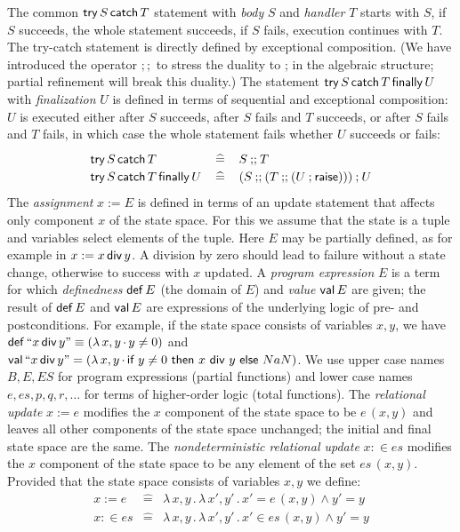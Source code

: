 \documentclass[submission,copyright,creativecommons]{eptcs}
\newcommand{\KW}[1]{\mathop{\sf #1}}
\newcommand{\RAISE}{\KW{raise}}
\newcommand{\semi}{\mathbin{;}}
\newcommand{\SEMI}{\mathbin{;\!;}}
\newcommand{\TRY}{\KW{try}}
\newcommand{\CATCH}{\KW{catch}}
\newcommand{\FINALLY}{\KW{finally}}
\newcommand{\DEF}{\KW{def}}
\newcommand{\VAL}{\KW{val}}
\newcommand{\con}{\wedge}
\renewcommand{\dot}{\mathop{.}}
\newcommand{\defeq}{\left.\widehat{=}\right.}
\newcommand{\DIV}{\KW{div}}
\begin{document}
The common $\TRY S \CATCH T$ statement with {\em body} $S$ and {\em handler} $T$ starts with $S$, if $S$ succeeds, the whole statement succeeds, if $S$ fails, execution continues with $T$. The try-catch statement is directly defined by exceptional composition. (We have introduced the operator $\SEMI$ to stress the duality to $\semi$ in the algebraic structure; partial refinement will break this duality.) The statement $\TRY S\CATCH T \FINALLY U$ with {\em finalization} $U$ is defined in terms of sequential and exceptional composition: $U$ is executed either after $S$ succeeds, after $S$ fails and $T$ succeeds, or after $S$ fails and $T$ fails, in which case the whole statement fails whether $U$ succeeds or fails:
\[\renewcommand{\arraystretch}{1.2}\begin{array}{lcl}
  \TRY S \CATCH T            & \defeq & S \SEMI T \\
  \TRY S \CATCH T \FINALLY U & \defeq & (S \SEMI (T \SEMI (U \semi \RAISE))) \semi U
\end{array}\]
The {\em assignment} $x := E$ is defined in terms of an update statement that affects only component $x$ of the state space. For this we assume that the state is a tuple and variables select elements of the tuple. Here $E$ may be partially defined, as for example in $x := x \DIV y$. A division by zero should lead to failure without a state change, otherwise to success with $x$ updated. A {\em program expression} $E$ is a term for which {\em definedness} $\DEF E$ (the domain of $E$) and {\em value} $\VAL E$ are given; the result of $\DEF E$ and $\VAL E$ are expressions of the underlying logic of pre- and postconditions. For example, if the state space consists of variables $x, y$, we have $\DEF ``x \DIV y" \equiv (\lambda\,x, y \dot y \neq 0)$ and $\VAL ``x \DIV y" = (\lambda\,x, y \dot \textsf{if}~y \neq 0~\textsf{then}~x~\textsf{div}~y~\textsf{else}~NaN)$. We use upper case names $B, E, ES$ for program expressions (partial functions) and lower case names $e, es, p, q, r, \ldots$ for terms of higher-order logic (total functions). The {\em relational update} $x := e$ modifies the $x$ component of the state space to be $e\,(x, y)$ and leaves all other components of the state space unchanged; the initial and final state space are the same. The {\em nondeterministic relational update} $x :\in es$ modifies the $x$ component of the state space to be any element of the set $es\,(x, y)$. Provided that the state space consists of variables $x, y$ we define:
\[\renewcommand{\arraystretch}{1.2}\begin{array}{lcl}
  x := e   & \defeq & \lambda\,x, y \dot \lambda\,x', y' \dot x' = e\,(x, y) \con y' = y \\
  x :\in es & \defeq & \lambda\,x, y \dot \lambda\,x', y' \dot x' \in es\,(x, y) \con y' = y
\end{array}\]
\end{document}
